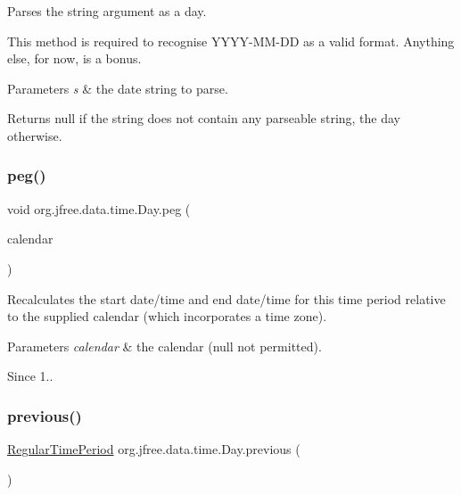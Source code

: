 Parses the string argument as a day. 

This method is required to recognise Y\+Y\+Y\+Y-\/\+M\+M-\/\+DD as a valid format. Anything else, for now, is a bonus.


\begin{DoxyParams}{Parameters}
{\em s} & the date string to parse.\\
\hline
\end{DoxyParams}
\begin{DoxyReturn}{Returns}
{\ttfamily null} if the string does not contain any parseable string, the day otherwise. 
\end{DoxyReturn}
\mbox{\label{classorg_1_1jfree_1_1data_1_1time_1_1_day_aec3e06803aa5e7984df40e3d90ae67d5}} 
\subsubsection{\texorpdfstring{peg()}{peg()}}
{\footnotesize\ttfamily void org.\+jfree.\+data.\+time.\+Day.\+peg (\begin{DoxyParamCaption}\item[{Calendar}]{calendar }\end{DoxyParamCaption})}

Recalculates the start date/time and end date/time for this time period relative to the supplied calendar (which incorporates a time zone).


\begin{DoxyParams}{Parameters}
{\em calendar} & the calendar ({\ttfamily null} not permitted).\\
\hline
\end{DoxyParams}
\begin{DoxySince}{Since}
1.. 
\end{DoxySince}
\mbox{\label{classorg_1_1jfree_1_1data_1_1time_1_1_day_ac7215f679acece03af9cf38b3bf11213}} 
\subsubsection{\texorpdfstring{previous()}{previous()}}
{\footnotesize\ttfamily \mbox{\hyperlink{classorg_1_1jfree_1_1data_1_1time_1_1_regular_time_period}{Regular\+Time\+Period}} org.\+jfree.\+data.\+time.\+Day.\+previous (\begin{DoxyParamCaption}{ }\end{DoxyParamCaption})}

